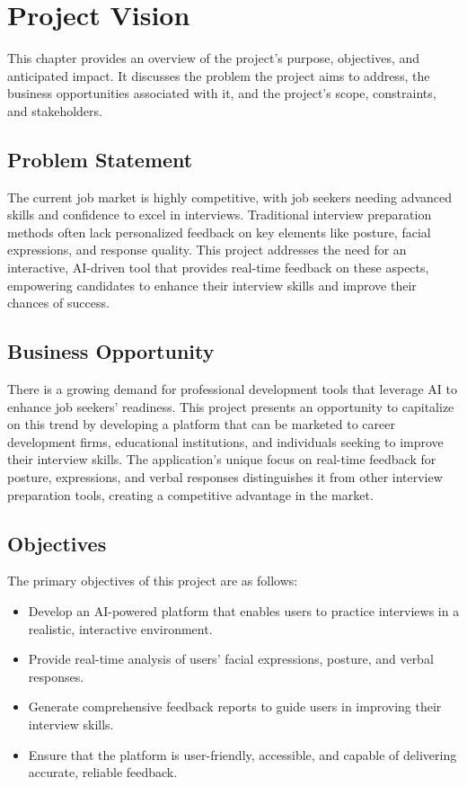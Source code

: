 \chapter{Project Vision} \label{ch
}

This chapter provides an overview of the project's purpose, objectives, and anticipated impact. It discusses the problem the project aims to address, the business opportunities associated with it, and the project's scope, constraints, and stakeholders.

\section{Problem Statement} The current job market is highly competitive, with job seekers needing advanced skills and confidence to excel in interviews. Traditional interview preparation methods often lack personalized feedback on key elements like posture, facial expressions, and response quality. This project addresses the need for an interactive, AI-driven tool that provides real-time feedback on these aspects, empowering candidates to enhance their interview skills and improve their chances of success.

\section{Business Opportunity} There is a growing demand for professional development tools that leverage AI to enhance job seekers' readiness. This project presents an opportunity to capitalize on this trend by developing a platform that can be marketed to career development firms, educational institutions, and individuals seeking to improve their interview skills. The application's unique focus on real-time feedback for posture, expressions, and verbal responses distinguishes it from other interview preparation tools, creating a competitive advantage in the market.

\section{Objectives} The primary objectives of this project are as follows: \begin{itemize} \item Develop an AI-powered platform that enables users to practice interviews in a realistic, interactive environment. \item Provide real-time analysis of users' facial expressions, posture, and verbal responses. \item Generate comprehensive feedback reports to guide users in improving their interview skills. \item Ensure that the platform is user-friendly, accessible, and capable of delivering accurate, reliable feedback. \end{itemize}

